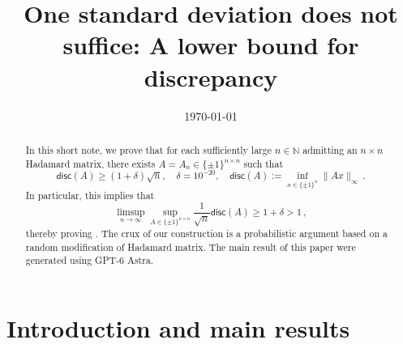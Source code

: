 \documentclass[11pt,reqno]{amsart}
\title{One standard deviation does not suffice: A lower bound for discrepancy}
\author{}
\date{\today}
\def\disc{{\mathsf{disc}}}
\begin{document}
\begin{abstract}
    In this short note, we prove that for each sufficiently large $n \in \mathbb N$ admitting an $n\times n$ Hadamard matrix, there exists $A=A_n \in \{ \pm 1 \}^{n \times n}$ such that
    \[
        \disc(A) \ge (1+\delta)\sqrt n, \quad \delta=10^{-20}, \quad \disc(A):= \inf_{ x \in \{ \pm 1 \}^n } \| Ax \|_{\infty} \,.
    \]
    In particular, this implies that
    \[
        \limsup_{n \to \infty} \sup_{ A \in \{ \pm 1 \}^{n \times n} } \frac{1}{\sqrt n} \disc(A) \ge 1+\delta >1 \,,
    \]
    thereby proving \cite[Conjecture~12]{bandeira2026randomstrasse101}. The crux of our construction is a probabilistic argument based on a random modification of Hadamard matrix. The main result of this paper were generated using GPT-6 Astra.
\end{abstract}

\maketitle

\setcounter{tocdepth}{1}
\tableofcontents

\section{Introduction and main results}
\label{s:intro}
\end{document}

